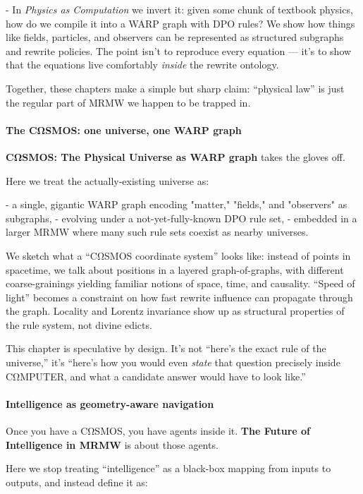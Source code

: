 - In \emph{Physics as Computation} we invert it: given some chunk of textbook physics, how do we compile it into a WARP graph with DPO rules? We show how things like fields, particles, and observers can be represented as structured subgraphs and rewrite policies. The point isn’t to reproduce every equation — it’s to show that the equations live comfortably \emph{inside} the rewrite ontology.

Together, these chapters make a simple but sharp claim: “physical law” is just the regular part of MRMW we happen to be trapped in.

\paragraph{The CΩSMOS: one universe, one WARP graph}

\textbf{CΩSMOS: The Physical Universe as WARP graph} takes the gloves off.

Here we treat the actually-existing universe as:

- a single, gigantic WARP graph encoding "matter," "fields," and "observers" as subgraphs,
- evolving under a not-yet-fully-known DPO rule set,
- embedded in a larger MRMW where many such rule sets coexist as nearby universes.

We sketch what a “CΩSMOS coordinate system” looks like: instead of points in spacetime, we talk about positions in a layered graph-of-graphs, with different coarse-grainings yielding familiar notions of space, time, and causality. “Speed of light” becomes a constraint on how fast rewrite influence can propagate through the graph. Locality and Lorentz invariance show up as structural properties of the rule system, not divine edicts.

This chapter is speculative by design. It’s not “here’s the exact rule of the universe,” it’s “here’s how you would even \emph{state} that question precisely inside CΩMPUTER, and what a candidate answer would have to look like.”

\paragraph{Intelligence as geometry-aware navigation}

Once you have a CΩSMOS, you have agents inside it. \textbf{The Future of Intelligence in MRMW} is about those agents.

Here we stop treating “intelligence” as a black-box mapping from inputs to outputs, and instead define it as:

